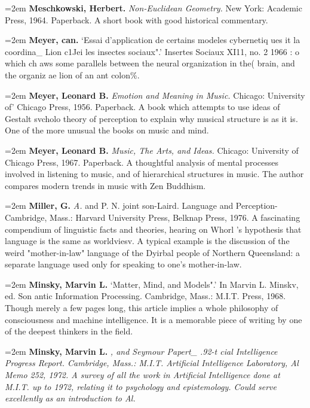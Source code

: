 \par\noindent\hangindent=2em {\bf Meschkowski, Herbert.} {\it Non-Euclidean Geometry.} New York: Academic Press, 1964. Paperback. A short book with good historical commentary.

\par\noindent\hangindent=2em {\bf Meyer, can.} `Essai d'application de certains modeles cybernetiq ues it la coordina\_ Lion c1Jei les insectes sociaux".' Insertes Sociaux XI11, no. 2 1966 : o which ch aws some parallels between the neural organization in the( brain, and the organiz ae lion of an ant colon\%.

\par\noindent\hangindent=2em {\bf Meyer, Leonard B.} {\it Emotion and Meaning in Music.} Chicago: University of' Chicago Press, 1956. Paperback. A book which attempts to use ideas of Gestalt svcholo theory of perception to explain why musical structure is as it is. One of the more unusual the books on music and mind.

\par\noindent\hangindent=2em {\bf Meyer, Leonard B.} {\it Music, The Arts, and Ideas.} Chicago: University of Chicago Press, 1967. Paperback. A thoughtful analysis of mental processes involved in listening to music, and of hierarchical structures in music. The author compares modern trends in music with Zen Buddhism.

\par\noindent\hangindent=2em {\bf Miller, G.} {\it A.} and P. N. joint son-Laird. Language and Perception- Cambridge, Mass.: Harvard University Press, Belknap Press, 1976. A fascinating compendium of linguistic facts and theories, hearing on Whorl 's hypothesis that language is the same as worldviesv. A typical example is the discussion of the weird "mother-in-law" language of the Dyirbal people of Northern Queensland: a separate language used only for speaking to one's mother-in-law.

\par\noindent\hangindent=2em {\bf Minsky, Marvin L.} `Matter, Mind, and Models".' In Marvin L. Minskv, ed. Son antic Information Processing. Cambridge, Mass.: M.I.T. Press, 1968. Though merely a few pages long, this article implies a whole philosophy of consciousness and machine intelligence. It is a memorable piece of writing by one of the deepest thinkers in the field.

\par\noindent\hangindent=2em {\bf Minsky, Marvin L.} {\it , and Seymour Papert\_ .92-t cial Intelligence Progress Report. Cambridge, Mass.: M.I.T. Artificial Intelligence Laboratory, Al Memo 252, 1972. A survey of all the work in Artificial Intelligence done at M.I.T. up to 1972, relating it to psychology and epistemology. Could serve excellently as an introduction to Al.} 

